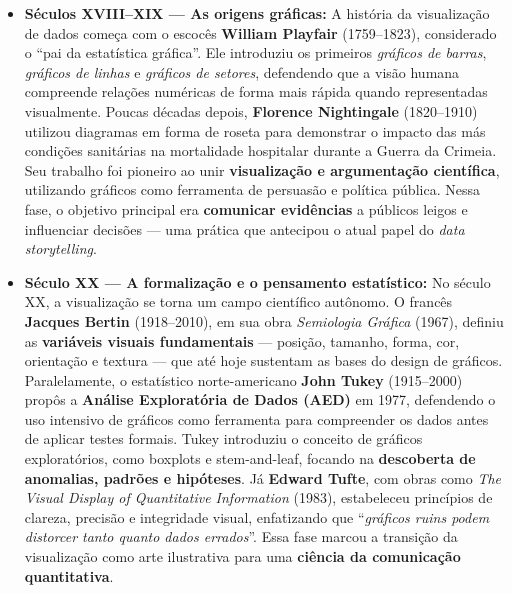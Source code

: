 \begin{itemize}[leftmargin=*]

  \item \textbf{Séculos XVIII–XIX — As origens gráficas:}  
  A história da visualização de dados começa com o escocês \textbf{William Playfair} (1759–1823), considerado o “pai da estatística gráfica”. Ele introduziu os primeiros \textit{gráficos de barras}, \textit{gráficos de linhas} e \textit{gráficos de setores}, defendendo que a visão humana compreende relações numéricas de forma mais rápida quando representadas visualmente.  
  Poucas décadas depois, \textbf{Florence Nightingale} (1820–1910) utilizou diagramas em forma de roseta para demonstrar o impacto das más condições sanitárias na mortalidade hospitalar durante a Guerra da Crimeia. Seu trabalho foi pioneiro ao unir \textbf{visualização e argumentação científica}, utilizando gráficos como ferramenta de persuasão e política pública.  
  Nessa fase, o objetivo principal era \textbf{comunicar evidências} a públicos leigos e influenciar decisões — uma prática que antecipou o atual papel do \textit{data storytelling}.

  \item \textbf{Século XX — A formalização e o pensamento estatístico:}  
  No século XX, a visualização se torna um campo científico autônomo. O francês \textbf{Jacques Bertin} (1918–2010), em sua obra \textit{Semiologia Gráfica} (1967), definiu as \textbf{variáveis visuais fundamentais} — posição, tamanho, forma, cor, orientação e textura — que até hoje sustentam as bases do design de gráficos.  
  Paralelamente, o estatístico norte-americano \textbf{John Tukey} (1915–2000) propôs a \textbf{Análise Exploratória de Dados (AED)} em 1977, defendendo o uso intensivo de gráficos como ferramenta para compreender os dados antes de aplicar testes formais. Tukey introduziu o conceito de gráficos exploratórios, como boxplots e stem-and-leaf, focando na \textbf{descoberta de anomalias, padrões e hipóteses}.  
  Já \textbf{Edward Tufte}, com obras como \textit{The Visual Display of Quantitative Information} (1983), estabeleceu princípios de clareza, precisão e integridade visual, enfatizando que “\textit{gráficos ruins podem distorcer tanto quanto dados errados}”.  
  Essa fase marcou a transição da visualização como arte ilustrativa para uma \textbf{ciência da comunicação quantitativa}.


\end{itemize}
